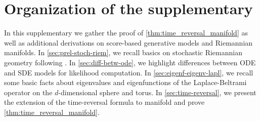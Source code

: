 \section{Organization of the supplementary}
\label{sec:organ-suppl}

In this supplementary we gather the proof of \cref{thm:time_reversal_manifold}
as well as additional derivations on score-based generative models and
Riemannian manifolds. In \cref{sec:prel-stoch-riem}, we recall basics on
stochastic Riemannian geometry following \cite{hsu2002stochastic}. In
\cref{sec:diff-betw-ode}, we highlight differences between ODE and SDE 
models for likelihood computation. In \cref{sec:eigenf-eigenv-lapl}, we recall
some basic facts about eigenvalues and eigenfunctions of the Laplace-Beltrami
operator on the $d$-dimensional sphere and torus. In \cref{sec:time-reversal},
we present the extension of the time-reversal formula to manifold and prove
\cref{thm:time_reversal_manifold}.

